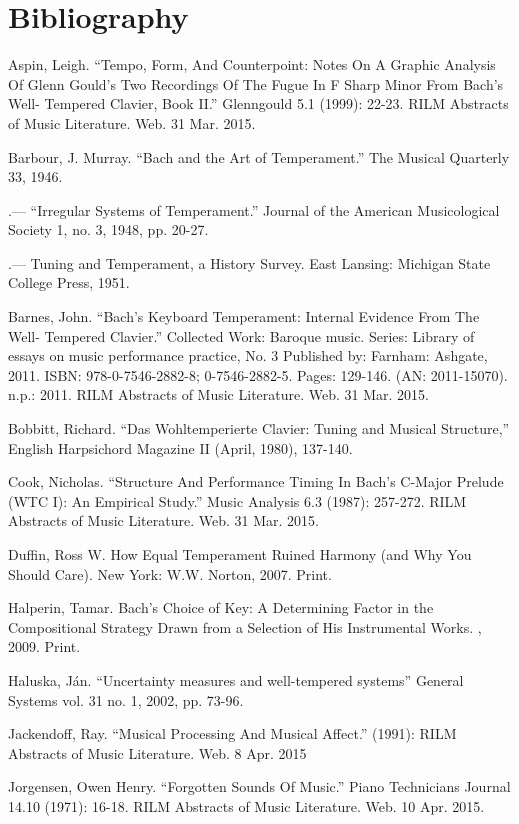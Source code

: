 {}
\chapter*{Bibliography}

\begin{hangparas}{0.5in}{1}
Aspin, Leigh. ``Tempo, Form, And Counterpoint: Notes On A Graphic Analysis Of Glenn Gould's Two Recordings Of The Fugue In F Sharp Minor From Bach's Well- Tempered Clavier, Book II.'' Glenngould 5.1 (1999): 22-23. RILM Abstracts of Music Literature. Web. 31 Mar. 2015.

Barbour, J. Murray. ``Bach and the Art of Temperament.'' The Musical
Quarterly 33, 1946.

.--- ``Irregular Systems of Temperament.'' Journal of the American Musicological Society 1, no. 3, 1948, pp. 20-27.

.--- Tuning and Temperament, a History Survey. East Lansing: Michigan State College Press, 1951.

Barnes, John. ``Bach's Keyboard Temperament: Internal Evidence From The Well- Tempered Clavier.'' Collected Work: Baroque music. Series: Library of essays on music performance practice, No. 3 Published by: Farnham: Ashgate, 2011. ISBN: 978-0-7546-2882-8; 0-7546-2882-5. Pages: 129-146. (AN: 2011-15070).  n.p.: 2011. RILM Abstracts of Music Literature. Web. 31 Mar. 2015.

Bobbitt, Richard. ``Das Wohltemperierte Clavier: Tuning and Musical Structure,'' English Harpsichord Magazine II (April, 1980), 137-140.

Cook, Nicholas. ``Structure And Performance Timing In Bach's C-Major Prelude (WTC I): An Empirical Study.'' Music Analysis 6.3 (1987): 257-272. RILM Abstracts of Music Literature. Web. 31 Mar. 2015.

Duffin, Ross W. How Equal Temperament Ruined Harmony (and Why You Should Care). New York: W.W. Norton, 2007. Print.

Halperin, Tamar. Bach's Choice of Key: A Determining Factor in the Compositional Strategy Drawn from a Selection of His Instrumental Works. , 2009.  Print.

Haluska, Ján. ``Uncertainty measures and well-tempered systems'' General Systems vol.  31 no. 1, 2002, pp. 73-96.

Jackendoff, Ray. ``Musical Processing And Musical Affect.'' (1991): RILM Abstracts of Music Literature. Web. 8 Apr. 2015

Jorgensen, Owen Henry. ``Forgotten Sounds Of Music.'' Piano Technicians Journal 14.10 (1971): 16-18. RILM Abstracts of Music Literature. Web. 10 Apr. 2015.


\end{hangparas}

